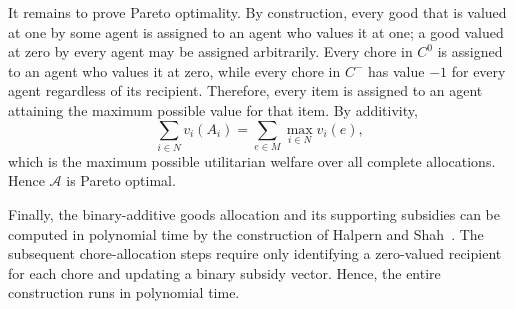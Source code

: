 \documentclass[11pt]{article}
\makeatletter
\theoremstyle{plain}
\theoremstyle{plain}
\renewenvironment{proof}[1][\proofname]{\par
  \pushQED{\qed}%
  \normalfont \topsep6\p@\@plus6\p@\relax
  \trivlist
  \item[\hskip\labelsep\bfseries #1\@addpunct{}]\ignorespaces
}{%
  \popQED\endtrivlist\@endpefalse
}
\newcommand{\alloc}{\mathcal{A}}              %
\makeatother
\begin{document}
\begin{proof}
It remains to prove Pareto optimality. By construction, every good that is valued at one by some agent is assigned to an agent who values it at one; a good valued at zero by every agent may be assigned arbitrarily. Every chore in $C^0$ is assigned to an agent who values it at zero, while every chore in $C^-$ has value $-1$ for every agent regardless of its recipient. Therefore, every item is assigned to an agent attaining the maximum possible value for that item. By additivity,
\[
\sum_{i\in N}v_i(A_i)
=
\sum_{e\in M}\max_{i\in N}v_i(e),
\]
which is the maximum possible utilitarian welfare over all complete allocations. Hence $\alloc$ is Pareto optimal.

Finally, the binary-additive goods allocation and its supporting subsidies can be computed in polynomial time by the construction of Halpern and Shah~\cite{HS19}. The subsequent chore-allocation steps require only identifying a zero-valued recipient for each chore and updating a binary subsidy vector. Hence, the entire construction runs in polynomial time.
\end{proof}




\end{document}
